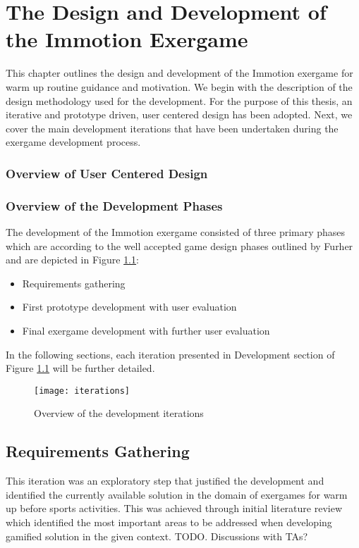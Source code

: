 \chapter{The Design and Development of the Immotion Exergame}\label{chapter:implementation}

This chapter outlines the design and development of the Immotion exergame for warm up routine guidance and motivation. We begin with the description of the design methodology used for the development. For the purpose of this thesis, an iterative and prototype driven, user centered design has been adopted. Next, we cover the main development iterations
that have been undertaken during the exergame development process. 

\subsection{Overview of User Centered Design}

\subsection{Overview of the Development Phases}
The development of the Immotion exergame consisted of three primary phases which are according to the well accepted game design phases outlined by Furher and are depicted in Figure \ref{fig:iterations}: 
\begin{itemize}
\item Requirements gathering 
\item First prototype development with user evaluation
\item Final exergame development with further user evaluation
\end{itemize}
In the following sections, each iteration presented in Development section of Figure \ref{fig:iterations} will be further detailed. 
\begin{figure}[h]
    \centering
    \texttt{[image: iterations]}
    \caption{Overview of the development iterations}
    \label{fig:iterations}
\end{figure}
\section{Requirements Gathering}
This iteration was an exploratory step that justified the development and identified the currently available solution in the domain of exergames for warm up before sports activities. This was achieved through initial literature review which identified the most important areas to be addressed when developing gamified solution in the given context. TODO. Discussions with TAs?
